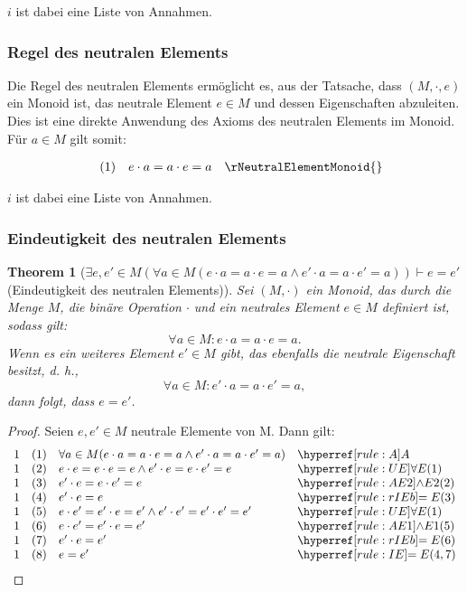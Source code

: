 \documentclass{book}
\theoremstyle{plain}
\newtheorem{theorem}{Theorem}
\theoremstyle{remark}
\theoremstyle{definition}
\begin{document}
\(i\) ist dabei eine Liste von Annahmen.

\subsubsection*{Regel des neutralen Elements}
\label{rule:rNeutralElementMonoid}
Die Regel des neutralen Elements ermöglicht es, aus der Tatsache, dass \((M, \cdot, e)\) ein Monoid ist, das neutrale Element \(e \in M\) und dessen Eigenschaften abzuleiten. Dies ist eine direkte Anwendung des Axioms des neutralen Elements im Monoid. Für \(a\in M\) gilt somit:

\[
\begin{array}{llll}
        & (1) & e \cdot a = a \cdot e = a & \rNeutralElementMonoid{} \\
\end{array}
\]

\(i\) ist dabei eine Liste von Annahmen.


\subsubsection*{Eindeutigkeit des neutralen Elements}
\label{ExeweApostropheInMLpFaaInMLpeMultaEqualsaMulteEqualsaAndeApostropheMultaEqualsaMulteApostropheEqualsaRpRpImpeEqualseApostrophe}
\begin{theorem}[\(\exists e, e' \in M (\forall a \in M (e \cdot a = a \cdot e = a \land e' \cdot a = a \cdot e' = a)) \vdash e = e'\) (Eindeutigkeit des neutralen Elements)]
Sei \((M, \cdot)\) ein Monoid, das durch die Menge \(M\), die binäre Operation \(\cdot\) und ein neutrales Element \(e \in M\) definiert ist, sodass gilt:
\[
\forall a \in M \colon e \cdot a = a \cdot e = a.
\]
Wenn es ein weiteres Element \(e' \in M\) gibt, das ebenfalls die neutrale Eigenschaft besitzt, d. h.,
\[
\forall a \in M \colon e' \cdot a = a \cdot e' = a,
\]
dann folgt, dass \(e = e'\).
\end{theorem}
\begin{proof}
    Seien \(e,e'\in M\) neutrale Elemente von M. Dann gilt:
    \[
	\begin{array}{llll}
		1 &  (1) & \forall a \in M(e \cdot a = a \cdot e = a \land e' \cdot a = a \cdot e' = a)  & \rA \\
		1 &  (2) & e \cdot e = e \cdot e = e \land e' \cdot e = e \cdot e' = e & \rUE{1} \\	
            1 &  (3) & e' \cdot e = e \cdot e' = e & \rAEb{2} \\	
            1 &  (4) & e' \cdot e = e & \rIEb{3} \\	
		1 &  (5) & e \cdot e' = e' \cdot e = e' \land e' \cdot e' = e' \cdot e' = e' & \rUE{1} \\	
		1 &  (6) & e \cdot e' = e' \cdot e = e' & \rAEa{5} \\	
            1 &  (7) & e' \cdot e = e' & \rIEb{6} \\	
            1 &  (8) & e = e' & \rIE{4,7} \\	
	\end{array}
	\]
\end{proof}
\end{document}
